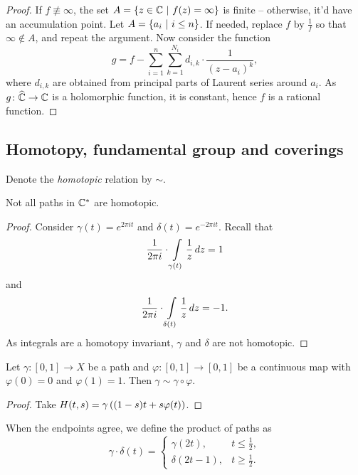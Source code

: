 \begin{proof}
If $f \not \equiv \infty$, the set
$A = \left\{z \in \mathbb{C}~\middle\vert~f(z) = \infty\right\}$ is finite -- otherwise, it'd
have an accumulation point. Let $A = \left\{a_i~\middle\vert~i \leq n\right\}$. If
needed, replace $f$ by $\frac{1}{f}$ so that $\infty \not \in A$,
and repeat the argument. Now consider the function
\[
g =
f - \sum_{i=1}^n \sum_{k=1}^{N_i}
d_{i,k} \cdot \frac{1}{(z - a_i)^k},
\]
where $d_{i,k}$ are obtained from principal parts of Laurent series
around $a_i$. As $g \colon \widehat{\mathbb{C}} \to \mathbb{C}$ is a holomorphic function,
it is constant, hence $f$ is a rational function.
\end{proof}

\newpage

\subsection{Homotopy, fundamental group and coverings}

\begin{definicija}
Denote the \emph{homotopic} relation by $\sim$.
\end{definicija}

\begin{trditev}
Not all paths in $\mathbb{C}^*$ are homotopic.
\end{trditev}

\begin{proof}
Consider $\gamma(t) = e^{2 \pi i t}$ and
$\delta(t) = e^{-2 \pi i t}$. Recall that
\[
\frac{1}{2 \pi i} \cdot \int\limits_{\gamma(t)} \frac{1}{z}\,dz = 1
\]
and
\[
\frac{1}{2 \pi i} \cdot \int\limits_{\delta(t)} \frac{1}{z}\,dz = -1.
\]
As integrals are a homotopy invariant, $\gamma$ and $\delta$ are
not homotopic.
\end{proof}


\begin{lema}[Reparametrization]
Let $\gamma \colon [0,1] \to X$ be a path and
$\varphi \colon [0,1] \to [0,1]$ be a continuous map with
$\varphi(0) = 0$ and $\varphi(1) = 1$. Then
$\gamma \sim \gamma \circ \varphi$.
\end{lema}

\begin{proof}
Take $H(t,s) = \gamma \left((1-s) t + s \varphi(t)\right)$.
\end{proof}

\begin{definicija}
When the endpoints agree, we define the product of paths as
\[
\gamma \cdot \delta (t) =
\begin{cases}
\gamma(2t), & t \leq \frac{1}{2}, \\
\delta(2t-1), & t \geq \frac{1}{2}.
\end{cases}
\]
\end{definicija}

